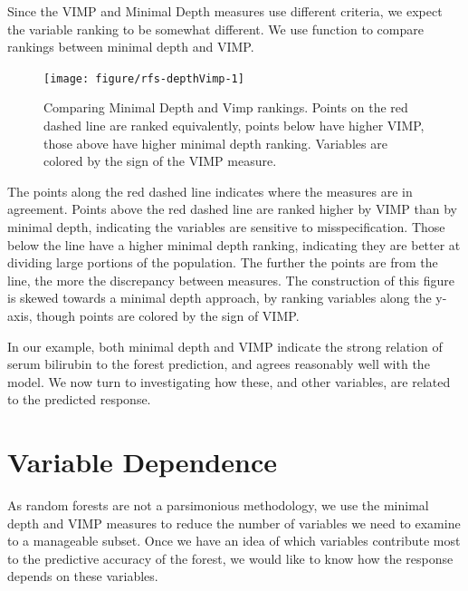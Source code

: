 \documentclass[nojss]{jss}\usepackage[]{graphicx}\usepackage[]{color}
\begin{document}
Since the VIMP and Minimal Depth measures use different criteria, we expect the variable ranking to be somewhat different. We use  function to compare rankings between minimal depth and VIMP.

\begin{Schunk}
\begin{figure}[!htpb]

{\centering \texttt{[image: figure/rfs-depthVimp-1]} 

}

\caption[Comparing Minimal Depth and Vimp rankings]{Comparing Minimal Depth and Vimp rankings. Points on the red dashed line are ranked equivalently, points below have higher VIMP, those above have higher minimal depth ranking. Variables are colored by the sign of the VIMP measure.\label{fig:depthVimp}}
\end{figure}
\end{Schunk}

The points along the red dashed line indicates where the measures are in agreement. Points above the red dashed line are ranked higher by VIMP than by minimal depth, indicating the variables are sensitive to misspecification. Those below the line have a higher minimal depth ranking, indicating they are better at dividing large portions of the population. The further the points are from the line, the more the discrepancy between measures. The construction of this figure is skewed towards a minimal depth approach, by ranking variables along the y-axis, though points are colored by the sign of VIMP. 

In our example, both minimal depth and VIMP indicate the strong relation of serum bilirubin to the forest prediction, and agrees reasonably well with the~\cite{fleming:1991} model. We now turn to investigating how these, and other variables, are related to the predicted response.

\section{Variable Dependence}\label{S:dependence}

As random forests are not a parsimonious methodology, we use the minimal depth and VIMP measures to reduce the number of variables we need to examine to a manageable subset. Once we have an idea of which variables contribute most to the predictive accuracy of the forest, we would like to know how the response depends on these variables.
\end{document}
